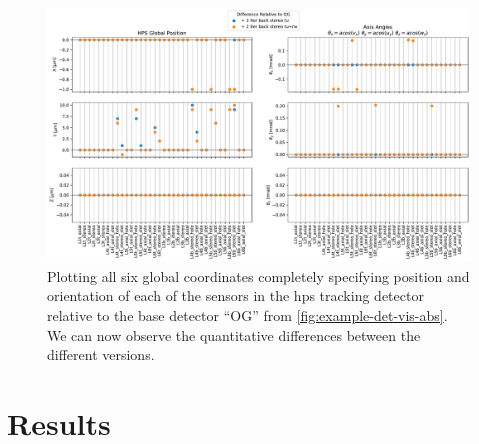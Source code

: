 \begin{figure}
	\centering
	\includegraphics[width=\textwidth]{figures/hps/alignment/example-det-vis-diff.pdf}
	\caption{Plotting all six global coordinates completely specifying position and
	orientation of each of the sensors in the \ac{hps} tracking detector relative to
	the base detector ``OG'' from \cref{fig:example-det-vis-abs}. We can now observe
	the quantitative differences between the different versions.}
	\label{fig:example-det-vis-diff}
\end{figure}

\section{Results}
